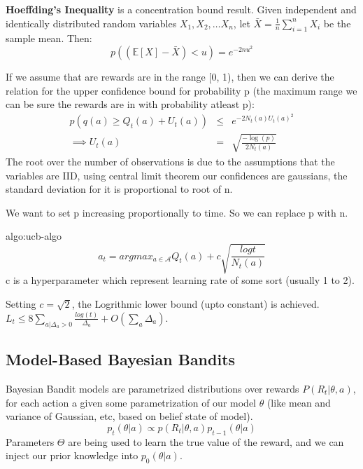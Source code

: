 \textbf{Hoeffding's Inequality} is a concentration bound result. Given independent and identically distributed random variables $X_1, X_2, \dots X_n$, let $\bar{X} = \frac{1}{n} \sum_{i=1}^{n} X_i$ be the sample mean. Then:
\begin{equation}
    p((\mathbb{E}[X] - \bar{X}) < u) = e^{-2nu^2}
\end{equation}

If we assume that are rewards are in the range [0, 1), then we can derive the relation for the upper confidence bound for probability p (the maximum range we can be sure the rewards are in with probability atleast p):
\begin{eqnarray*}
    p(q(a) \geq Q_t(a) + U_t(a)) &\leq& e^{-2N_t(a)U_t(a)^2} \\
    \implies U_t(a) &=& \sqrt{\frac{-\log(p)}{2N_t(a)}}
\end{eqnarray*}
The root over the number of observations is due to the assumptions that the variables are IID, using central limit theorem our confidences are gaussians, the standard deviation for it is proportional to root of n.

We want to set p increasing proportionally to time. So we can replace p with n.

\begin{algo}{algo:ucb-algo}
    \begin{equation}
        a_t = argmax_{a \in \mathcal{A}} Q_t(a) + c\sqrt{\frac{log t}{N_t(a)}}
    \end{equation}
    c is a hyperparameter which represent learning rate of some sort (usually 1 to 2).

    Setting $c = \sqrt{2}$, the Logrithmic lower bound (upto constant) is achieved. $L_t \leq 8 \sum_{a \vert \Delta_a > 0} \frac{log(t)}{\Delta_a} + O(\sum_a \Delta_a)$.
\end{algo}


\subsection{Model-Based Bayesian Bandits}

Bayesian Bandit models are parametrized distributions over rewards $P(R_t \vert \theta, a)$, for each action a given some parametrization of our model $\theta$ (like mean and variance of Gaussian, etc, based on belief state of model).
\begin{equation}
    p_t(\theta | a) \propto p(R_t | \theta, a) p_{t-1}(\theta | a)
\end{equation}
Parameters $\Theta$ are being used to learn the true value of the reward, and we can inject our prior knowledge into $p_{0}(\theta | a)$.

